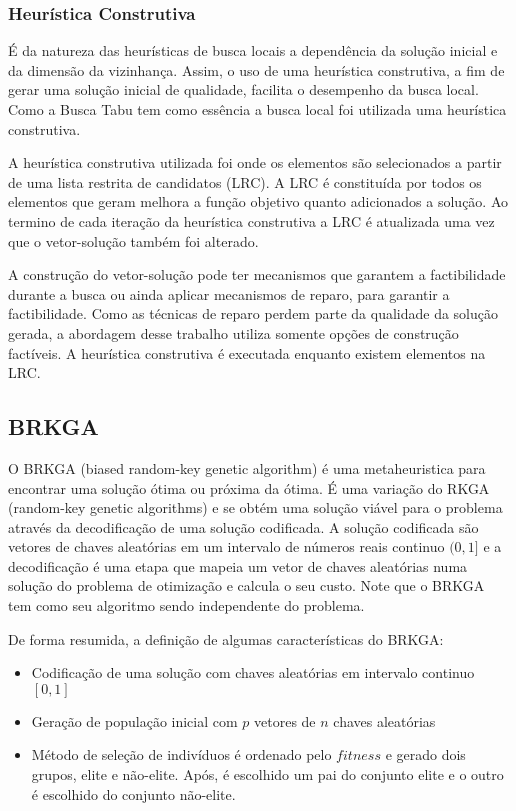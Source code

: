 \documentclass[12pt,a4paper]{article}
\begin{document}
    \subsubsection{Heurística Construtiva}

        É da natureza das heurísticas de busca locais a dependência da solução inicial e da dimensão da vizinhança. Assim, o uso de uma heurística construtiva, a fim de gerar uma solução inicial de
        qualidade, facilita o desempenho da busca local. Como a Busca Tabu tem como essência a busca local foi utilizada uma heurística construtiva.


        A heurística construtiva utilizada foi onde os elementos são selecionados a partir de uma lista restrita de candidatos (LRC). A LRC é constituída por todos os elementos que geram
        melhora a função objetivo quanto adicionados a solução. Ao termino de cada iteração da heurística construtiva a LRC é atualizada uma vez que o vetor-solução também foi alterado.


        A construção do vetor-solução pode ter mecanismos que garantem a factibilidade durante a busca ou ainda aplicar mecanismos de reparo, para garantir a factibilidade. Como as técnicas de
        reparo perdem parte da qualidade da solução gerada, a abordagem desse trabalho utiliza somente opções de construção factíveis. A heurística construtiva é executada enquanto existem elementos
        na LRC.

        


\subsection{BRKGA}

O BRKGA (biased random-key genetic algorithm)\cite{gonccalves2011biased} é uma metaheuristica para encontrar uma solução ótima ou próxima da ótima. É uma variação do RKGA
(random-key genetic algorithms) \cite{bean1994genetic} e se obtém uma solução viável para o problema através da decodificação de uma solução codificada. A solução codificada são vetores de
chaves aleatórias em um intervalo de números reais continuo $(0,1]$ e a decodificação é uma etapa que mapeia um vetor de chaves aleatórias numa solução do problema de otimização e calcula o
seu custo. Note que o BRKGA tem como seu algoritmo sendo independente do problema. 

De forma resumida, a definição de algumas características do BRKGA: 


\begin{itemize}
\item Codificação de uma solução com chaves aleatórias em intervalo continuo $[0,1]$ 
\item Geração de população inicial com $p$ vetores de $n$ chaves aleatórias
\item Método de seleção de indivíduos é ordenado pelo $fitness$ e gerado dois grupos, elite e não-elite. Após, é escolhido um pai do conjunto elite e o outro é escolhido do conjunto não-elite. 
\end{itemize}
\end{document}
